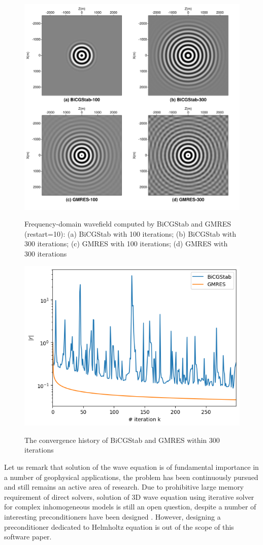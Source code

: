 \documentclass[10pt]{article}
\begin{document}
\begin{figure}
  \centering
  \includegraphics[width=\linewidth]{wave.pdf}\label{fig:wave}
  \caption{Frequency-domain wavefield computed by BiCGStab and GMRES (restart=10): (a) BiCGStab with 100 iterations; (b) BiCGStab with 300 iterations; (c) GMRES with 100 iterations; (d) GMRES with 300 iterations}
\end{figure}


\begin{figure}
  \centering
  \includegraphics[width=0.7\linewidth]{bicgstab_gmres.png}\label{fig:bicgstabgmres}
  \caption{The convergence history of BiCGStab and GMRES within 300 iterations}
\end{figure}


Let us remark that solution of the wave equation is of fundamental importance in a number of geophysical applications, the problem has been continuously  pursued and still remains an active area of research. Due to prohibitive large memory requirement of direct solvers, solution of 3D wave equation using iterative solver for complex inhomogeneous models is still an open question, despite a number of interesting preconditioners have been designed \citep{Vuik_2003_SLH,Engquist_2011_SPE}. However, designing a preconditioner dedicated to Helmholtz equation is out of the scope of this software paper.
\end{document}
